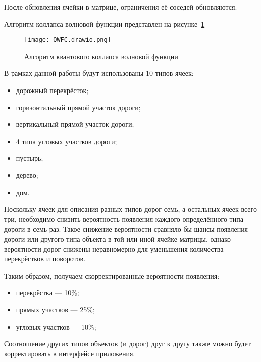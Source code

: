 После обновления ячейки в матрице, ограничения её соседей обновляются.

Алгоритм коллапса волновой функции представлен на рисунке~\ref{fig:QWFC}

\newpage

\begin{figure}[h!]
    \centering
    \texttt{[image: QWFC.drawio.png]}
    \caption{Алгоритм квантового коллапса волновой функции}
    \label{fig:QWFC}
\end{figure}

В рамках данной работы будут использованы 10 типов ячеек:

\begin{itemize}
    \item дорожный перекрёсток;
    \item горизонтальный прямой участок дороги;
    \item вертикальный прямой участок дороги;
    \item 4 типа угловых участков дороги;
    \item пустырь;
    \item дерево;
    \item дом.
\end{itemize}

Поскольку ячеек для описания разных типов дорог семь, а остальных ячеек всего три, необходимо снизить вероятность появления каждого определённого типа дороги в семь раз. Такое снижение вероятности сравняло бы шансы появления дороги или другого типа объекта в той или иной ячейке матрицы, однако вероятности дорог снижены неравномерно для уменьшения количества перекрёстков и поворотов.

Таким образом, получаем скорректированные вероятности появления:
\begin{itemize}
    \item перекрёстка --- 10\%;
    \item прямых участков --- 25\%;
    \item угловых участков --- 10\%;
\end{itemize}

Соотношение других типов объектов (и дорог) друг к другу также можно будет корректировать в интерфейсе приложения.

